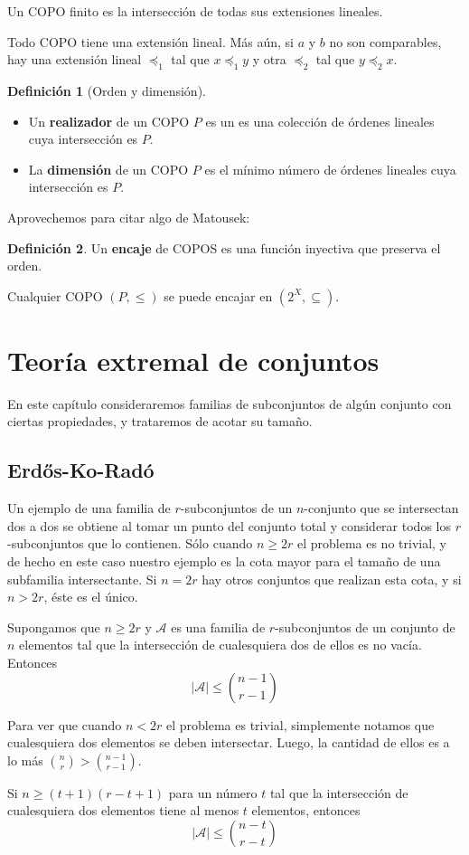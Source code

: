 \documentclass[spanish]{book}
\theoremstyle{definition}
\newtheorem*{defn}{Definición}
\begin{document}
\begin{teo}
	Un COPO finito es la intersección de todas sus extensiones lineales.
\end{teo}

\begin{teo}
	Todo COPO tiene una extensión lineal. Más aún, si $a$ y $b$ no son comparables, hay una extensión lineal $\preccurlyeq_1$ tal que $x\preccurlyeq_1 y$ y otra $\preccurlyeq_2$ tal que $y\preccurlyeq_2 x$.
\end{teo}

\begin{defn}[Orden y dimensión]\leavevmode
	\begin{itemize}
	\item Un \textbf{realizador} de un COPO $P$ es un es una colección de órdenes lineales cuya intersección es $P$.
	\item La \textbf{dimensión} de un COPO $P$ es el mínimo número de órdenes lineales cuya intersección es $P$.
	\end{itemize}
\end{defn}
Aprovechemos para citar algo de Matousek:
\begin{defn}
	Un \textbf{encaje} de COPOS es una función inyectiva que preserva el orden.
\end{defn}
\begin{teo}
	Cualquier COPO $(P,\leq)$ se puede encajar en $(2^X,\subseteq)$.
\end{teo}

\chapter{Teoría extremal de conjuntos}
En este capítulo consideraremos familias de subconjuntos de algún conjunto con ciertas propiedades, y trataremos de acotar su tamaño.

\section{Erdős-Ko-Radó}
Un ejemplo de una familia de $r$-subconjuntos de un $n$-conjunto que se intersectan dos a dos se obtiene al tomar un punto del conjunto total y considerar todos los $r$-subconjuntos que lo contienen. Sólo cuando $n\geq2r$ el problema es no trivial, y de hecho en este caso nuestro ejemplo es la cota mayor para el tamaño de una subfamilia intersectante. Si $n=2r$ hay otros conjuntos que realizan esta cota, y si $n>2r$, éste es el único.
\begin{teo}
	Supongamos que $n\geq 2r$ y $\mathcal{A}$ es una familia de $r$-subconjuntos de un conjunto de $n$ elementos tal que la intersección de cualesquiera dos de ellos es no vacía. Entonces
	\[|\mathcal{A}|\leq{n-1\choose r-1}\]
\end{teo}
Para ver que cuando $n<2r$ el problema es trivial, simplemente notamos que cualesquiera dos elementos se deben intersectar. Luego, la cantidad de ellos es a lo más ${n\choose r}>{n-1\choose r-1}$.
\begin{teo}
	Si $n\geq(t+1)(r-t+1)$ para un número $t$ tal que la intersección de cualesquiera dos elementos tiene al menos $t$ elementos, entonces
	\[|\mathcal{A}|\leq{n-t\choose r-t}\]
\end{teo}
\end{document}
